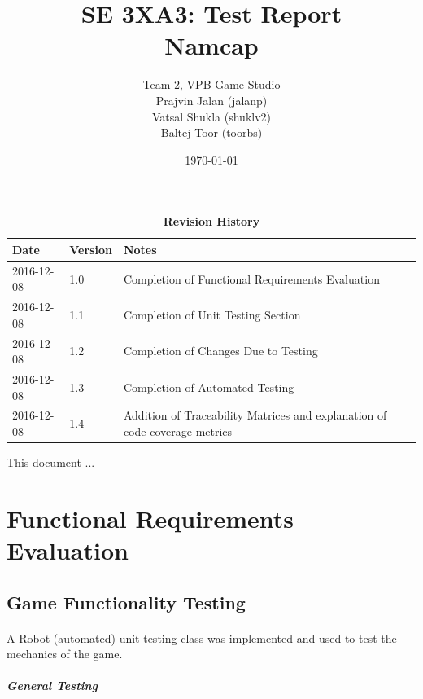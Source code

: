 \documentclass[12pt, titlepage]{article}
\title{SE 3XA3: Test Report\\Namcap}
\author{Team 2, VPB Game Studio
		\\ Prajvin Jalan (jalanp)
		\\ Vatsal Shukla (shuklv2)
		\\ Baltej Toor (toorbs)
}
\date{\today}
\begin{document}
\maketitle

\tableofcontents
\listoftables
\listoffigures

\begin{table}[h]
\caption{\bf Revision History}
\begin{tabularx}{\textwidth}{p{3cm}p{2cm}X}
\toprule {\bf Date} & {\bf Version} & {\bf Notes}\\
\midrule
2016-12-08 & 1.0 & Completion of Functional Requirements Evaluation\\
2016-12-08 & 1.1 & Completion of Unit Testing Section\\
2016-12-08 & 1.2 & Completion of Changes Due to Testing\\
2016-12-08 & 1.3 & Completion of Automated Testing\\
2016-12-08 & 1.4 & Addition of Traceability Matrices and explanation of code coverage metrics\\
\bottomrule
\end{tabularx}
\end{table}

\newpage


This document ...

\section{Functional Requirements Evaluation}

\subsection{Game Functionality Testing}

\paragraph{}
A Robot (automated) unit testing class was implemented and used to test the mechanics of the game.

\subparagraph{General Testing}
\end{document}
